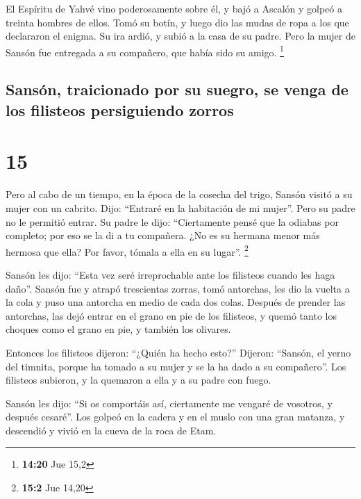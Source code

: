  El Espíritu de Yahvé vino poderosamente sobre él, y bajó
a Ascalón y golpeó a treinta hombres de ellos. Tomó su botín, y luego
dio las mudas de ropa a los que declararon el enigma. Su ira ardió, y
subió a la casa de su padre.  Pero la mujer de Sansón fue
entregada a su compañero, que había sido su amigo. \footnote{\textbf{14:20}
  Jue 15,2}

\hypertarget{sansuxf3n-traicionado-por-su-suegro-se-venga-de-los-filisteos-persiguiendo-zorros}{%
\subsection{Sansón, traicionado por su suegro, se venga de los filisteos
persiguiendo
zorros}\label{sansuxf3n-traicionado-por-su-suegro-se-venga-de-los-filisteos-persiguiendo-zorros}}

\hypertarget{section-14}{%
\section{15}\label{section-14}}

 Pero al cabo de un tiempo, en la época de la cosecha del
trigo, Sansón visitó a su mujer con un cabrito. Dijo: ``Entraré en la
habitación de mi mujer''. Pero su padre no le permitió entrar.
 Su padre le dijo: ``Ciertamente pensé que la odiabas por
completo; por eso se la di a tu compañera. ¿No es su hermana menor más
hermosa que ella? Por favor, tómala a ella en su lugar''. \footnote{\textbf{15:2}
  Jue 14,20}

 Sansón les dijo: ``Esta vez seré irreprochable ante los
filisteos cuando les haga daño''.  Sansón fue y atrapó
trescientas zorras, tomó antorchas, les dio la vuelta a la cola y puso
una antorcha en medio de cada dos colas.  Después de
prender las antorchas, las dejó entrar en el grano en pie de los
filisteos, y quemó tanto los choques como el grano en pie, y también los
olivares.

 Entonces los filisteos dijeron: ``¿Quién ha hecho esto?''
Dijeron: ``Sansón, el yerno del timnita, porque ha tomado a su mujer y
se la ha dado a su compañero''. Los filisteos subieron, y la quemaron a
ella y a su padre con fuego.

 Sansón les dijo: ``Si os comportáis así, ciertamente me
vengaré de vosotros, y después cesaré''.  Los golpeó en la
cadera y en el muslo con una gran matanza, y descendió y vivió en la
cueva de la roca de Etam.

